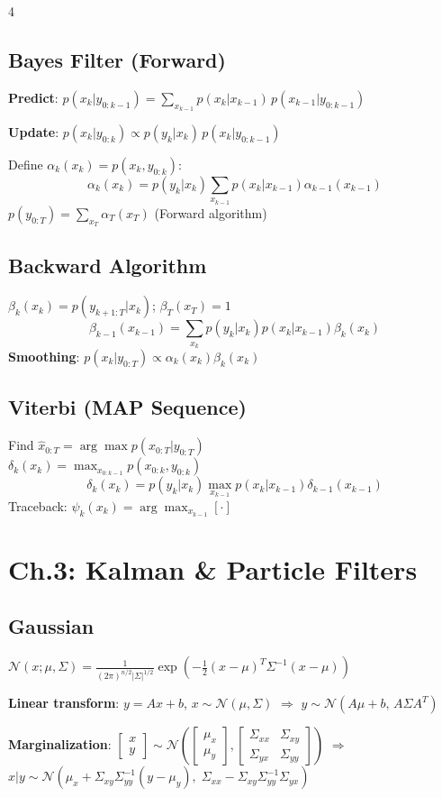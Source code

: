 \documentclass[8pt,landscape]{article}
\begin{document}
\begin{multicols}{4}
\subsection{Bayes Filter (Forward)}
\textbf{Predict}: $p(x_k|y_{0:k-1})=\sum_{x_{k-1}}p(x_k|x_{k-1})\,p(x_{k-1}|y_{0:k-1})$

\textbf{Update}: $p(x_k|y_{0:k})\propto p(y_k|x_k)\,p(x_k|y_{0:k-1})$

Define $\alpha_k(x_k)=p(x_k,y_{0:k})$:
\[\alpha_k(x_k)=p(y_k|x_k)\sum_{x_{k-1}}p(x_k|x_{k-1})\alpha_{k-1}(x_{k-1})\]
$p(y_{0:T})=\sum_{x_T}\alpha_T(x_T)$ \quad (Forward algorithm)

\subsection{Backward Algorithm}
$\beta_k(x_k)=p(y_{k+1:T}|x_k)$; $\beta_T(x_T)=1$
\[\beta_{k-1}(x_{k-1})=\sum_{x_k}p(y_k|x_k)p(x_k|x_{k-1})\beta_k(x_k)\]
\textbf{Smoothing}: $p(x_k|y_{0:T})\propto\alpha_k(x_k)\beta_k(x_k)$

\subsection{Viterbi (MAP Sequence)}
Find $\hat{x}_{0:T}=\arg\max p(x_{0:T}|y_{0:T})$\\
$\delta_k(x_k)=\max_{x_{0:k-1}}p(x_{0:k},y_{0:k})$
\[\delta_k(x_k)=p(y_k|x_k)\max_{x_{k-1}}p(x_k|x_{k-1})\delta_{k-1}(x_{k-1})\]
Traceback: $\psi_k(x_k)=\arg\max_{x_{k-1}}[\cdot]$

\section{Ch.3: Kalman \& Particle Filters}

\subsection{Gaussian}
$\mathcal{N}(x;\mu,\Sigma)=\frac{1}{(2\pi)^{n/2}|\Sigma|^{1/2}}\exp\!\left(-\tfrac{1}{2}(x-\mu)^T\Sigma^{-1}(x-\mu)\right)$

\textbf{Linear transform}: $y=Ax+b$, $x\sim\mathcal{N}(\mu,\Sigma)$ $\Rightarrow$ $y\sim\mathcal{N}(A\mu+b,\,A\Sigma A^T)$

\textbf{Marginalization}: $\begin{bmatrix}x\\y\end{bmatrix}\sim\mathcal{N}\!\left(\begin{bmatrix}\mu_x\\\mu_y\end{bmatrix},\begin{bmatrix}\Sigma_{xx}&\Sigma_{xy}\\\Sigma_{yx}&\Sigma_{yy}\end{bmatrix}\right)$
$\Rightarrow$ $x|y\sim\mathcal{N}(\mu_x+\Sigma_{xy}\Sigma_{yy}^{-1}(y-\mu_y),\;\Sigma_{xx}-\Sigma_{xy}\Sigma_{yy}^{-1}\Sigma_{yx})$


\end{multicols}
\end{document}
